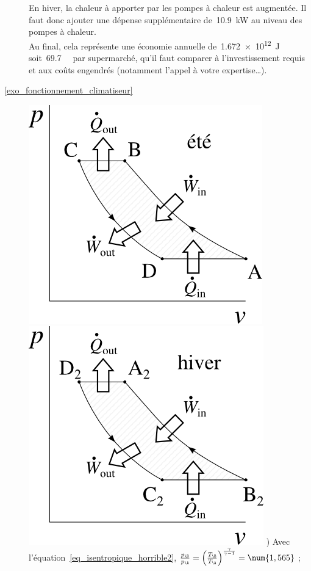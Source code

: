\begin{description}
			En hiver, la chaleur à apporter par les pompes à chaleur est augmentée. Il faut donc ajouter une dépense supplémentaire de~\SI{10,9}{\kilo\watt} au niveau des pompes à chaleur.\\
			Au final, cela représente une économie annuelle de~\SI{1,672e12}{\joule} soit~\SI{69,7}{\kilo\euroo} par supermarché, qu’il faut comparer à l’investissement requis et aux coûts engendrés (notamment l’appel à votre expertise…).
	\item [\ref{exo_fonctionnement_climatiseur}]
				\includegraphics[height=\solutiondiagramwidth]{images/exo_sol_pv_climatiseur.png}
				\includegraphics[height=\solutiondiagramwidth]{images/exo_sol_pv_thermopompe.png}
				) Avec l’équation~\ref{eq_isentropique_horrible2}, $\frac{p_\B }{p_\A} = \left(\frac{T_\B}{T_\A}\right)^{\frac{\gamma}{\gamma - 1}} = \num{1,565}$ ;

\end{description}
